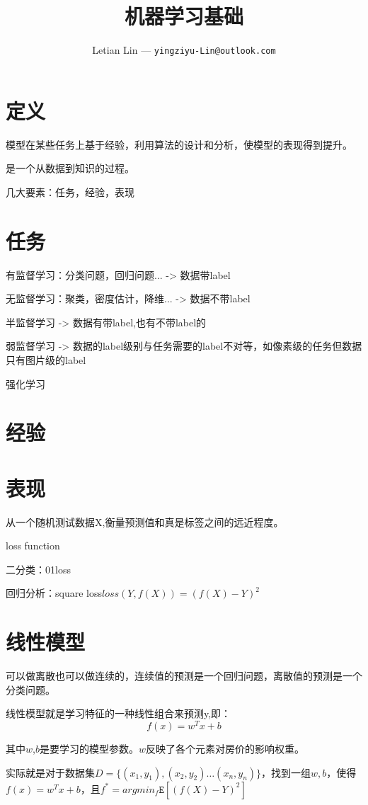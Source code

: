 \documentclass[UTF8]{ctexart}
\title{
	机器学习基础
}
\author{
	Letian Lin --- \texttt{yingziyu-Lin@outlook.com}
}
\begin{document}
\maketitle

\section{定义}
模型在某些任务上基于经验，利用算法的设计和分析，使模型的表现得到提升。

是一个从数据到知识的过程。

几大要素：任务，经验，表现

\section{任务}
有监督学习：分类问题，回归问题... -> 数据带label

无监督学习：聚类，密度估计，降维... -> 数据不带label

半监督学习 -> 数据有带label,也有不带label的

弱监督学习 -> 数据的label级别与任务需要的label不对等，如像素级的任务但数据只有图片级的label

强化学习

\section{经验}

\section{表现}
从一个随机测试数据X,衡量预测值和真是标签之间的远近程度。

loss function

二分类：01loss

回归分析：square loss$loss(Y,f(X))=(f(X) - Y)^2$

\section{线性模型}
可以做离散也可以做连续的，连续值的预测是一个回归问题，离散值的预测是一个分类问题。

线性模型就是学习特征的一种线性组合来预测y,即：$$f(x)=w^Tx+b$$

其中$w$,$b$是要学习的模型参数。$w$反映了各个元素对房价的影响权重。

实际就是对于数据集$D=\{(x_1,y_1),(x_2,y_2)\dots (x_n,y_n)\}$，找到一组$w,b$，使得$f(x)=w^Tx+b$，且$f^*=argmin_f \mathtt{E}[(f(X)-Y)^2]$
\end{document}
